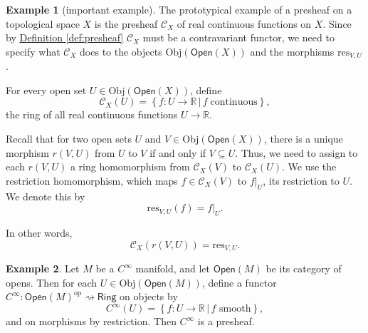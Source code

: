 \documentclass[a4paper]{report}
\newcommand{\R}{\mathbb{R}}
\newcommand{\Obj}{\mathrm{Obj}}
\theoremstyle{definition}
\newtheorem{example}{Example}[section]
\theoremstyle{plain}
\theoremstyle{remark}
\begin{document}
\begin{example}[important example] 
  \label{eg:functionpresheaf} 
  The prototypical example of a presheaf on a topological space $X$ is the presheaf $\mathcal{C}_{X}$ of real continuous functions on $X$. Since by \hyperref[def:presheaf]{Definition \ref*{def:presheaf}} $\mathcal{C}_X$ must be a contravariant functor, we need to specify what $\mathcal{C}_{X}$ does to the objects $\Obj(\mathsf{Open}(X))$ and the morphisms $\mathrm{res}_{V,U}$.

  For every open set $U \in \Obj(\mathsf{Open}(X))$, define
  \begin{equation*} 
    \mathcal{C}_{X}(U) = \left\{ f\colon U \to \R\,\big| \, f\; \mathrm{ continuous} \right\}, 
  \end{equation*} 
  the ring of all real continuous functions $U \to \R$.

  Recall that for two open sets $U$ and $V \in \Obj(\mathsf{Open}(X))$, there is a unique morphism $r(V,U)$ from $U$ to $V$ if and only if $V \subseteq U$. Thus, we need to assign to each $r(V,U)$ a ring homomorphism from $\mathcal{C}_{X}(V)$ to $\mathcal{C}_{X}(U)$. We use the restriction homomorphism, which maps $f \in \mathcal{C}_{X}(V)$ to $f|_{U}$, its restriction to $U$. We denote this by
  \begin{equation*}
    \mathrm{res}_{V,U}(f) = f|_{U}.
  \end{equation*}

  In other words,
  \begin{equation*}
    \mathcal{C}_{X}(r(V,U)) = \mathrm{res}_{V,U}.
  \end{equation*}
\end{example}

\begin{example}
  \label{eg:smoothpresheaf}
  Let $M$ be a $C^{\infty}$ manifold, and let $\mathsf{Open}(M)$ be its category of opens. Then for each $U \in \Obj(\mathsf{Open}(M))$, define a functor $C^{\infty}\colon \mathsf{Open}(M)^{\text{op}} \rightsquigarrow \mathsf{Ring}$ on objects by
  \begin{equation*}
    C^{\infty}(U) = \left\{ f\colon U \to \R\,\big|\, f\text{ smooth} \right\},
  \end{equation*}
  and on morphisms by restriction. Then $C^{\infty}$ is a presheaf.
\end{example}
\end{document}
